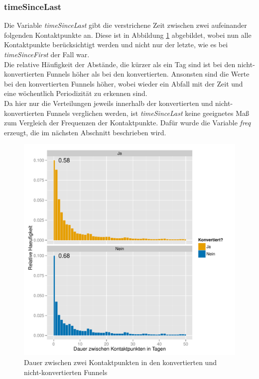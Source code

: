 \subsubsection*{timeSinceLast}
Die Variable \textit{timeSinceLast} gibt die verstrichene Zeit zwischen zwei aufeinander folgenden Kontaktpunkte an. Diese ist in Abbildung \ref{timeSinceLast} abgebildet, wobei nun alle Kontaktpunkte berücksichtigt werden und nicht nur der letzte, wie es bei \textit{timeSinceFirst} der Fall war.\\
Die relative Häufigkeit der Abstände, die kürzer als ein Tag sind ist bei den nicht-konvertierten Funnels höher als bei den konvertierten. Ansonsten sind die Werte bei den konvertierten Funnels höher, wobei wieder ein Abfall mit der Zeit und eine wöchentlich Periodizität zu erkennen sind.\\
Da hier nur die Verteilungen jeweils innerhalb der konvertierten und nicht-konvertierten Funnels verglichen werden, ist \textit{timeSinceLast} keine geeignetes Maß zum Vergleich der Frequenzen der Kontaktpunkte. Dafür wurde die Variable \textit{freq} erzeugt, die im nächsten Abschnitt beschrieben wird.
\begin{figure}[H]
    \centering
    \includegraphics[scale=0.5]{timeSinceLast.pdf}
    \caption[Dauer zwischen zwei Kontaktpunkten]{Dauer zwischen zwei Kontaktpunkten in den konvertierten und nicht-konvertierten Funnels}
    \label{timeSinceLast}
\end{figure}

